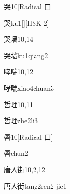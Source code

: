 \begin{entry}{哭}{10}[Radical 口]
  \begin{phonetics}{哭}{ku1}[][HSK 2]
  \end{phonetics}
\end{entry}

\begin{entry}{哭墙}{10,14}
  \begin{phonetics}{哭墙}{ku1qiang2}
  \end{phonetics}
\end{entry}

\begin{entry}{哮喘}{10,12}
  \begin{phonetics}{哮喘}{xiao4chuan3}
  \end{phonetics}
\end{entry}

\begin{entry}{哲理}{10,11}
  \begin{phonetics}{哲理}{zhe2li3}
  \end{phonetics}
\end{entry}

\begin{entry}{唇}{10}[Radical ⼝]
  \begin{phonetics}{唇}{chun2}
  \end{phonetics}
\end{entry}

\begin{entry}{唐人街}{10,2,12}
  \begin{phonetics}{唐人街}{tang2ren2 jie1}
  \end{phonetics}
\end{entry}

